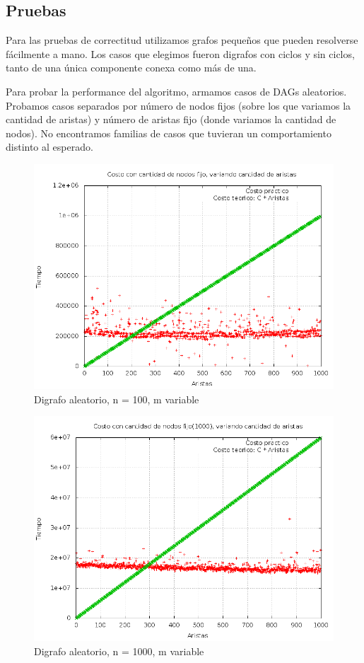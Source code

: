 \subsection{Pruebas}
Para las pruebas de correctitud utilizamos grafos peque\~nos que pueden resolverse f\'acilmente a mano. 
Los casos que elegimos fueron digrafos con ciclos y sin ciclos, tanto de una \'unica componente conexa como m\'as de una.


Para probar la performance del algoritmo, armamos casos de DAGs aleatorios. Probamos casos separados por n\'umero de nodos fijos (sobre los que variamos la cantidad de aristas) y n\'umero de aristas fijo (donde variamos la cantidad de nodos). 
No encontramos familias de casos que tuvieran un comportamiento distinto al esperado.


\begin{figure}[H]
	\centering
	\includegraphics[scale=0.5]{dag_100.png}
	\caption{Digrafo aleatorio, n = 100, m variable}
\end{figure}

\begin{figure}[H]
	\centering
	\includegraphics[scale=0.5]{dag_1000.png}
	\caption{Digrafo aleatorio, n = 1000, m variable}
\end{figure}


